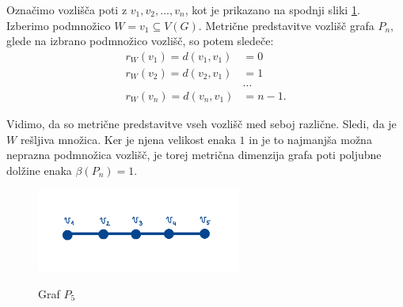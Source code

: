\documentclass[mat1, tisk]{fmfdelo}
\begin{document}
\begin{primer} \label{primer_2.4.}
Označimo vozlišča poti z $v_1, v_2, ..., v_n$, kot je prikazano na spodnji sliki \ref{fig:pot}. 
Izberimo podmnožico $W = {v_1} \subseteq V(G).$ Metrične predstavitve vozlišč grafa $P_n$, 
glede na izbrano podmnožico vozlišč, so potem sledeče:
\begin{align*}
    r_W(v_1) = d(v_1, v_1) & = 0 \\
    r_W(v_2) = d(v_2, v_1) & = 1 \\
    & \dots \\
    r_W(v_n) = d(v_n, v_1) & = n-1.
\end{align*}

Vidimo, da so metrične predstavitve vseh vozlišč med seboj različne. Sledi, da je $W$ 
rešljiva množica. Ker je njena velikost enaka $1$ in je to najmanjša možna neprazna podmnožica 
vozlišč, je torej metrična dimenzija grafa poti poljubne dolžine enaka $\beta(P_n) = 1.$

\begin{figure}[h]
    \caption{Graf $P_5$}
    \centering
    \includegraphics[width=0.6\textwidth]{IMG_pot.jpg}
    \label{fig:pot}      
\end{figure}

\end{primer}
\end{document}
